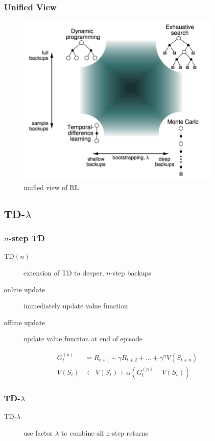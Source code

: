 \documentclass[]{article}
\theoremstyle{definition}
\begin{document}
\subsubsection{Unified View}%
\label{ssub:unified_view}

\begin{figure}[ht]
    \centering
    \includegraphics[width=0.5\linewidth]{unified-view.png}
    \caption{unified view of RL}
    \label{fig:unified-view}
\end{figure}

\subsection{TD-$\lambda$}%
\label{sub:td_lambda_}

\subsubsection{$n$-step TD}%
\label{ssub:_n_step_td}

\begin{description}
    \item[TD$(n)$] extension of TD to deeper, $n$-step backups
    \item[online update] immediately update value function
    \item[offline update] update value function at end of episode
\end{description}
\begin{align*}
    G_t^{(n)} &= R_{t+1} + \gamma R_{t+2} + \ldots + \gamma^n V(S_{t+n}) \\
    V(S_t) &\gets V(S_t) + \alpha (G_t^{(n)} - V(S_t))
\end{align*}

\subsubsection{TD-$\lambda$}%
\label{ssub:averaging_n_step_returns}
\begin{description}
    \item[TD-$\lambda$] use factor $\lambda$ to combine all n-step returns
\end{description}
\end{document}
